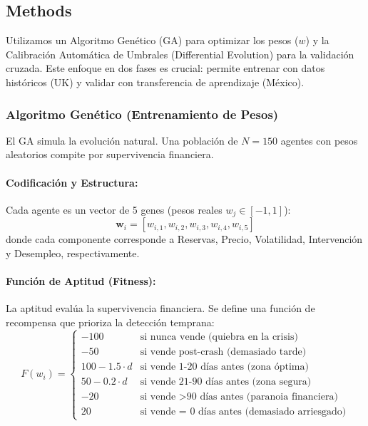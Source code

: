 \subsection{Methods}

Utilizamos un Algoritmo Genético (GA) para optimizar los pesos ($w$) y la Calibración Automática de Umbrales (Differential Evolution) para la validación cruzada. Este enfoque en dos fases es crucial: permite entrenar con datos históricos (UK) y validar con transferencia de aprendizaje (México).

\subsubsection{Algoritmo Genético (Entrenamiento de Pesos)}

El GA simula la evolución natural. Una población de $N=150$ agentes con pesos aleatorios compite por supervivencia financiera.

\paragraph{Codificación y Estructura:}
Cada agente es un vector de 5 genes (pesos reales $w_j \in [-1, 1]$):
$$\mathbf{w}_i = [w_{i,1}, w_{i,2}, w_{i,3}, w_{i,4}, w_{i,5}]$$
donde cada componente corresponde a Reservas, Precio, Volatilidad, Intervención y Desempleo, respectivamente.

\paragraph{Función de Aptitud (Fitness):}
La aptitud evalúa la supervivencia financiera. Se define una función de recompensa que prioriza la detección temprana:
\begin{equation}
F(w_i) = \begin{cases}
-100 & \text{si nunca vende (quiebra en la crisis)} \\
-50 & \text{si vende post-crash (demasiado tarde)} \\
100 - 1.5 \cdot d & \text{si vende 1-20 días antes (zona óptima)} \\
50 - 0.2 \cdot d & \text{si vende 21-90 días antes (zona segura)} \\
-20 & \text{si vende >90 días antes (paranoia financiera)
}
 \\
20 & \text{si vende = 0 días antes (demasiado arriesgado)}
\end{cases}
\end{equation}

